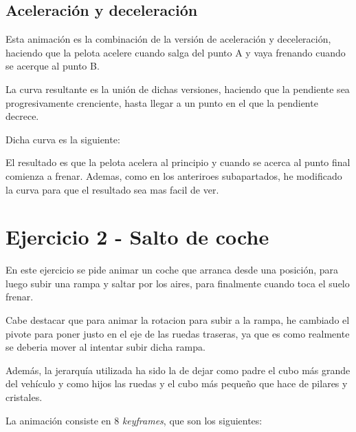 \documentclass{article}
\begin{document}
\subsection{Aceleración y deceleración}

Esta animación es la combinación de la versión de aceleración y deceleración, haciendo que la pelota acelere cuando salga del punto A y vaya frenando cuando se acerque al punto B. 

La curva resultante es la unión de dichas versiones, haciendo que la pendiente sea progresivamente crenciente, hasta llegar a un punto en el que la pendiente decrece. 

Dicha curva es la siguiente:


El resultado es que la pelota acelera al principio y cuando se acerca al punto final comienza a frenar. Ademas, como en los anteriroes subapartados, he modificado la curva para que el resultado sea mas facil de ver.


\section{Ejercicio 2 - Salto de coche}

En este ejercicio se pide animar un coche que arranca desde una posición, para luego subir una rampa y saltar por los aires, para finalmente cuando toca el suelo frenar.


Cabe destacar que para animar la rotacion para subir a la rampa, he cambiado el pivote para poner justo en el eje de las ruedas traseras, ya que es como realmente se deberia mover al intentar subir dicha rampa. 

Además, la jerarquía utilizada ha sido la de dejar como padre el cubo más grande del vehículo y como hijos las ruedas y el cubo más pequeño que hace de pilares y cristales.


La animación consiste en 8 \textit{keyframes}, que son los siguientes:
\end{document}

